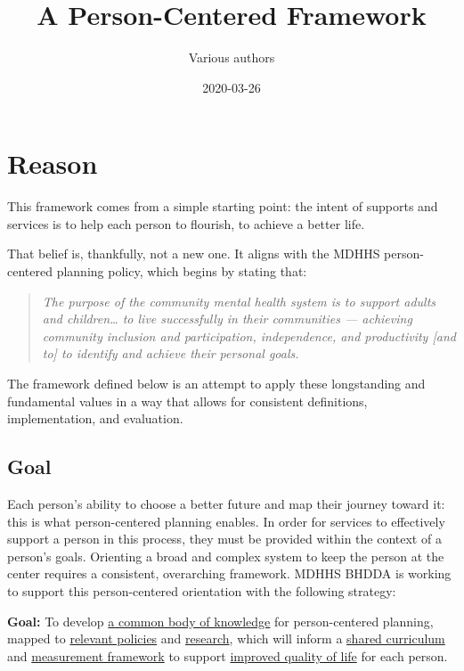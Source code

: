 \documentclass[
]{book}
\title{A Person-Centered Framework}
\author{Various authors}
\date{2020-03-26}
\begin{document}
\maketitle

{
\setcounter{tocdepth}{1}
\tableofcontents
}
\hypertarget{reason}{%
\chapter{Reason}\label{reason}}

This framework comes from a simple starting point: the intent of supports and services is to help each person to flourish, to achieve a better life.

That belief is, thankfully, not a new one. It aligns with the MDHHS person-centered planning policy\citep{pcp-policy}, which begins by stating that:

\begin{quote}
\emph{The purpose of the community mental health system is to support adults and children\ldots{} to live successfully in their communities --- achieving community inclusion and participation, independence, and productivity {[}and to{]} to identify and achieve their personal goals.}
\end{quote}

The framework defined below is an attempt to apply these longstanding and fundamental values in a way that allows for consistent definitions, implementation, and evaluation.

\hypertarget{goal}{%
\section{Goal}\label{goal}}

Each person's ability to choose a better future and map their journey toward it: this is what person-centered planning enables. In order for services to effectively support a person in this process, they must be provided within the context of a person's goals. Orienting a broad and complex system to keep the person at the center requires a consistent, overarching framework. MDHHS BHDDA is working to support this person-centered orientation with the following strategy:

\textbf{Goal:} To develop \protect\hyperlink{bok}{a common body of knowledge} for person-centered planning,
mapped to \protect\hyperlink{policy}{relevant policies} and \protect\hyperlink{research}{research},
which will inform a \protect\hyperlink{curriculum}{shared curriculum}
and \protect\hyperlink{measure}{measurement framework}
to support \protect\hyperlink{pcpdca}{improved quality of life} for each person.
\end{document}
